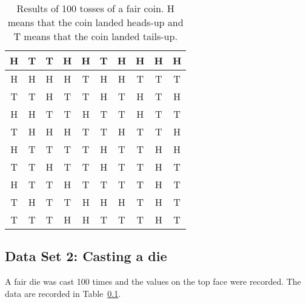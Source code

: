 \documentclass[10pt,a4paper,titlepage,twoside,openright]{report}
\begin{document}
\begin{table}[htb]
\begin{center}
\begin{tabular}{|c|c|c|c|c|c|c|c|c|c|}\hline
H & T & T & H & H & T & H & H & H & H\\\hline
H & H & H & H & T & H & H & T & T & T\\\hline
T & T & H & T & T & H & T & H & T & H\\\hline
H & H & T & T & H & T & T & H & T & T\\\hline
T & H & H & H & T & T & H & T & T & H\\\hline
H & T & T & T & T & H & T & T & H & H\\\hline
T & T & H & T & T & H & T & T & H & T\\\hline
H & T & T & H & T & T & T & T & H & T\\\hline
T & H & T & T & H & H & H & T & H & T\\\hline
T & T & T & H & H & T & T & T & H & T\\\hline\end{tabular}
\end{center}
\caption{Results of 100 tosses of a fair coin. H means that the coin landed heads-up and T means that the coin landed tails-up.}
\label{tab:mdat:s:dataset1}
\end{table}

\subsection{Data Set 2: Casting a die}
\label{mdat:s:ed:dataset2}

A fair die was cast 100 times and the values on the top face were recorded. The data are recorded in Table~\ref{mdat:s:ed:dataset2}.
\end{document}
